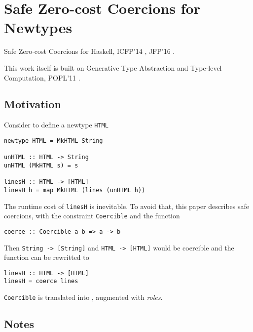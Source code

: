 \section{Safe Zero-cost Coercions for Newtypes}

Safe Zero-cost Coercions for Haskell, ICFP'14
\citep{Breitner:2014:SZC:2628136.2628141}, JFP'16 \citep{breitner2016safe}.

This work itself is built on Generative Type Abstraction and Type-level
Computation, POPL'11 \citep{Weirich:2011:GTA:1926385.1926411}.

\subsection{Motivation}

Consider to define a newtype \verb|HTML|

\begin{verbatim}
newtype HTML = MkHTML String

unHTML :: HTML -> String
unHTML (MkHTML s) = s

linesH :: HTML -> [HTML]
linesH h = map MkHTML (lines (unHTML h))
\end{verbatim}

The runtime cost of \verb|linesH| is inevitable. To avoid that, this paper
describes safe coercions, with the constraint \verb|Coercible| and the function

\begin{verbatim}
coerce :: Coercible a b => a -> b
\end{verbatim}

Then \verb|String -> [String]| and \verb|HTML -> [HTML]| would be coercible and
the function can be rewritted to

\begin{verbatim}
linesH :: HTML -> [HTML]
linesH = coerce lines
\end{verbatim}

\verb|Coercible| is translated into \FC, augmented with \textit{roles}.

\subsection{Notes}

